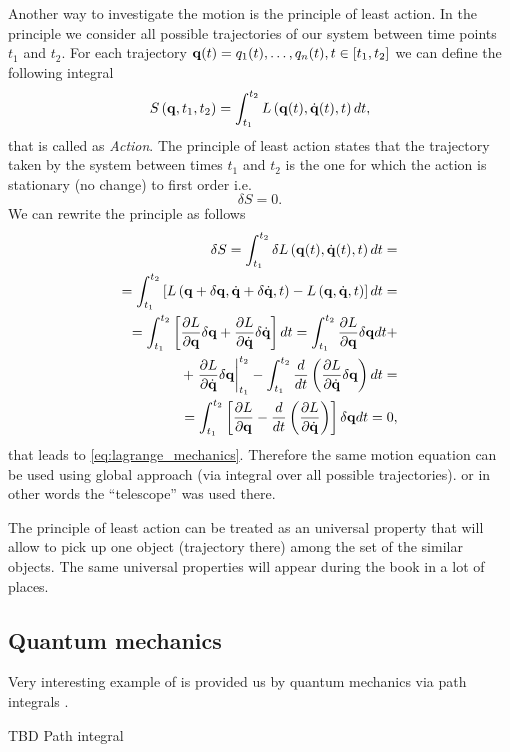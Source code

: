 Another way to investigate the motion is the principle of least
action.  In the principle we consider
all possible trajectories of our system between time points $t_1$ and
$t_2$. For each trajectory ${\bf q}(t) = {q_1(t), \dots, q_n(t)}, t
\in [t_1, t_2]$ we can define the following integral
\[
S\left({\bf q}, t_1, t_2\right) = \int_{t_1}^{t_2}L\left({\bf q}(t), 
\dot{\bf q}(t), t\right) dt,
\] 
that is called as \textit{Action}. The principle of least action
states that the trajectory taken by the system between times $t_1$ and
$t_2$ is the one for which the action is stationary (no change) to
first order \cite{wiki:least_action_principle} i.e.
\[
\delta S = 0.
\]
We can rewrite the principle as follows
\begin{eqnarray}
\delta S = 
\int_{t_1}^{t_2} \delta L\left({\bf q}(t), 
\dot{\bf q}(t), t\right) dt = 
\nonumber \\
=
\int_{t_1}^{t_2} \left[L\left({\bf q} + \delta {\bf q} , 
\dot{\bf q} + \delta \dot{\bf q}, t\right) - L\left({\bf q}, 
\dot{\bf q}, t\right)\right] dt = 
\nonumber \\
= 
\int_{t_1}^{t_2} \left[\frac{\partial L}{\partial {\bf q}} \delta {\bf
    q} + \frac{\partial L}{\partial \dot{\bf q}} \delta \dot{\bf
    q}\right] dt =  
\int_{t_1}^{t_2} \frac{\partial L}{\partial {\bf q}} \delta {\bf
    q} dt 
+
\nonumber \\
+
\left. \frac{\partial L}{\partial \dot{\bf q}} \delta {\bf q} \right|_{t_1}^{t_2} - 
\int_{t_1}^{t_2} \frac{d}{d t} \left( \frac{\partial L}{\partial
  \dot{\bf q}} \delta {\bf q}\right) dt = 
\nonumber \\
= \int_{t_1}^{t_2} \left[
\frac{\partial L}{\partial {\bf q}} -
\frac{d}{d t} \left( \frac{\partial L}{\partial
  \dot{\bf q}} \right)
\right] \delta {\bf q} dt = 0,
\nonumber
\end{eqnarray}
that leads to \eqref{eq:lagrange_mechanics}. Therefore the same motion
equation can be used using global approach (via integral over all
possible trajectories). or in other words the ``telescope'' was used
there. 

\begin{remark}
\label{rem:universalpropertymechanics}
The principle of least action can be treated as an universal property
that will allow to pick up one object (trajectory there) among the set
of the similar objects. The same universal properties will appear
during the book in a lot of places.
\end{remark}

\subsection{Quantum mechanics}

Very interesting example of  is provided us by
quantum mechanics via path integrals \cite{feynman2010quantum}. 

TBD Path integral
